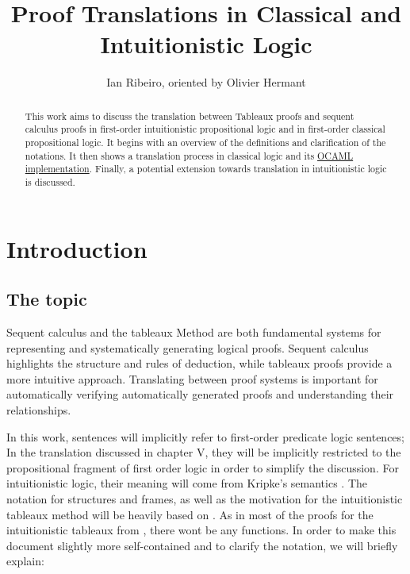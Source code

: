 \documentclass[runningheads]{llncs}
\begin{document}
%
\title{Proof Translations in Classical and Intuitionistic Logic}
%
%
\author{Ian Ribeiro, oriented by Olivier Hermant}
%

%
%
\maketitle              %
%
\begin{abstract}
This work aims to discuss the translation between Tableaux proofs and sequent calculus proofs in first-order intuitionistic propositional logic and in first-order classical propositional logic.
It begins with an overview of the definitions and clarification of the notations.
It then shows a translation process in classical logic and its   \href{https://github.com/lontra-lontra/proof-translations}{OCAML implementation}.
Finally, a potential extension towards translation in intuitionistic logic is discussed.
\end{abstract}
%
%
\section{Introduction}
\subsection{The topic}


Sequent calculus and the tableaux Method are both fundamental systems for representing and systematically generating logical proofs. 
Sequent calculus highlights the structure and rules of deduction, while tableaux proofs provide a more intuitive approach. 
Translating between proof systems is important for automatically verifying automatically generated proofs and understanding their relationships.

In this work, sentences will implicitly refer to first-order predicate logic sentences; In the translation discussed in chapter V, they 
will be implicitly restricted to the propositional fragment of first order logic in order to simplify the discussion. 
For intuitionistic logic, their meaning will come from Kripke's semantics \cite{kripke1965} . The notation for structures and frames, as well as the motivation for
the intuitionistic tableaux method will be heavily based on \cite{book1}. As in most of the proofs for the intuitionistic tableaux from \cite{book1}, there wont be any functions.  
In order to make this document slightly more self-contained and to clarify the notation, we will briefly explain:
\end{document}
